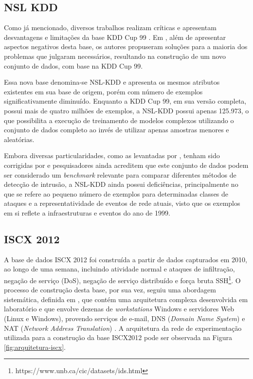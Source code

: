 \subsection{NSL KDD}

Como já mencionado, diversos trabalhos realizam críticas e apresentam desvantagens e limitações da base KDD Cup 99 \cite{mchugh2000, wang2014}. Em , além de apresentar aspectos negativos desta base, os autores propuseram soluções para a maioria dos problemas que julgaram necessários, resultando na construção de um novo conjunto de dados, com base na KDD Cup 99.

Essa nova base denomina-se NSL-KDD e apresenta os mesmos atributos existentes em sua base de origem, porém com número de exemplos significativamente diminuído. Enquanto a KDD Cup 99, em sua versão completa, possui mais de quatro milhões de exemplos, a NSL-KDD possui apenas 125.973, o que possibilita a execução de treinamento de modelos complexos utilizando o conjunto de dados completo ao invés de utilizar apenas amostras menores e aleatórias.

Embora diversas particularidades, como as levantadas por , tenham sido corrigidas por  e pesquisadores ainda acreditem que este conjunto de dados podem ser considerado um \textit{benchmark} relevante para comparar diferentes métodos de detecção de intrusão, a NSL-KDD ainda possui deficiências, principalmente no que se refere ao pequeno número de exemplos para determinadas classes de ataques e a representatividade de eventos de rede atuais, visto que os exemplos em si reflete a infraestruturas e eventos do ano de 1999.

\subsection{ISCX 2012}

A base de dados ISCX 2012 foi construída a partir de dados capturados em 2010, ao longo de uma semana, incluindo atividade normal e ataques de infiltração, negação de serviço (DoS), negação de serviço distribuído e força bruta SSH\footnote{\label{fn:iscx2012}https://www.unb.ca/cic/datasets/ids.html}. O processo de construção desta base, por sua vez, seguiu uma abordagem sistemática, definida em , que contém uma arquitetura complexa desenvolvida em laboratório e que envolve dezenas de \textit{workstations} Windows e servidores Web (Linux e Windows), provendo serviços de e-mail, DNS (\textit{Domain Name System}) e NAT (\textit{Network Address Translation}) \cite{fernandez2019}. A arquitetura da rede de experimentação utilizada para a construção da base ISCX2012 pode ser observada na Figura \ref{fig:arquitetura-iscx}.

